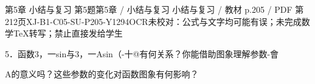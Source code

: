 \begin{bankitem}{第5章 小结与复习 第5题}{第5章 / 小结与复习 小结与复习 / 教材 p.205 / PDF 第212页}{XJ-B1-C05-SU-P205-Y1294}{OCR未校对：公式与文字均可能有误；未完成数学TeX转写；禁止直接发给学生}
\begin{ocrdraft}
\par
5．函数3，一sin与3，一Asin（-十@有何关系？你能借助图象理解参数-會
\par
A的意义吗？这些参数的变化对函数图象有何影响？
\end{ocrdraft}
\end{bankitem}
